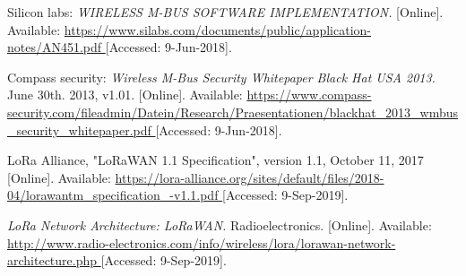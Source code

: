 \begin{thebibliography}{9}

Silicon labs: 
\textit{
WIRELESS M-BUS SOFTWARE IMPLEMENTATION.
}
[Online]. Available:
\url{
https://www.silabs.com/documents/public/application-notes/AN451.pdf
}
[Accessed: 9-Jun-2018].


Compass security:
\textit{
Wireless M-Bus Security Whitepaper Black Hat USA 2013.
}
June 30th. 2013, v1.01.
[Online]. Available:
\url{
https://www.compass-security.com/fileadmin/Datein/Research/Praesentationen/blackhat_2013_wmbus_security_whitepaper.pdf
}
[Accessed: 9-Jun-2018].



LoRa Alliance, "LoRaWAN 1.1 Specification", version 1.1, October 11, 2017
[Online]. Available:
\url{
https://lora-alliance.org/sites/default/files/2018-04/lorawantm_specification_-v1.1.pdf
}
[Accessed: 9-Sep-2019].


\textit{
LoRa Network Architecture: LoRaWAN.
}
Radioelectronics.
[Online]. Available:
\url{
http://www.radio-electronics.com/info/wireless/lora/lorawan-network-architecture.php
}
[Accessed: 9-Sep-2019].







\end{thebibliography}
